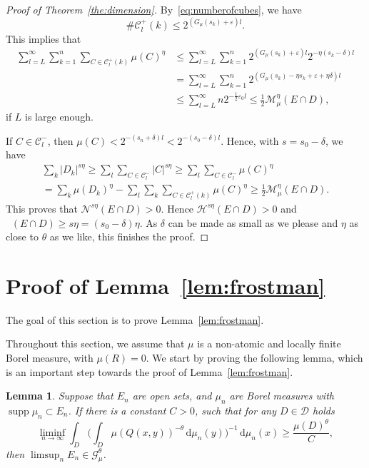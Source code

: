 \documentclass[11pt]{article}
\newtheorem{lemm}[theo]{Lemma}
\theoremstyle{definition}
\numberwithin{equation}{section}
\numberwithin{figure}{section}
\numberwithin{table}{section}
\DeclareMathOperator{\dimh}{dim_H}
\DeclareMathOperator{\supp}{supp}
\newcommand*{\dd}{\mathrm{d}}
\begin{document}
\begin{proof}[Proof of Theorem~\ref{the:dimension}]
By~\eqref{eq:numberofcubes}, we have
\[
\# \mathscr{C}_l^+ (k) \leq 2^{(G_{\mu} (s_k) + \varepsilon)l}.
\]
This implies that
\begin{align*}
\sum_{l=L}^\infty \sum_{k=1}^n \sum_{C \in \mathscr{C}_l^+ (k)}
\mu (C)^\eta &\leq \sum_{l=L}^\infty \sum_{k=1}^n 2^{(G_{\mu} (s_k) + \varepsilon)l} 2^{-\eta (s_k-\delta) l} \\ & =
\sum_{l=L}^\infty \sum_{k=1}^n 2^{(G_\mu (s_k) - \eta s_k +
\varepsilon + \eta \delta) l} \\ &\leq \sum_{l=L}^\infty n 2^{-\frac{1}{2} \varepsilon_0 l} \leq \frac{1}{2}
\mathscr{M}_\mu^\eta (E \cap D),
\end{align*}
if $L$ is large enough.

If $C \in \mathscr{C}_l^-$, then $\mu (C) < 2^{-(s_n+\delta)l} < 2^{-(s_0-\delta)l}$. Hence, with $s = s_0 - \delta$, we have
\begin{multline*}
\sum_k |D_k|^{s \eta} \geq \sum_l \sum_{C \in \mathscr{C}_l^-} |C|^{s \eta} \geq \sum_l \sum_{C \in \mathscr{C}_l^-} \mu (C)^\eta \\ = \sum_k \mu(D_k)^\eta - \sum_l \sum_k \sum_{C \in
\mathscr{C}_l^+ (k)} \mu (C)^\eta \geq \frac{1}{2}
\mathscr{M}_\mu^\eta (E \cap D).
\end{multline*}
This proves that $\mathscr{N}^{s \eta} (E \cap D) > 0$. Hence $\mathscr{H}^{s \eta} (E \cap D) > 0$ and $\dimh (E \cap D) \geq s
\eta = (s_0 - \delta) \eta$. As $\delta$ can be made as small as we please and $\eta$ as close to $\theta$ as we like, this finishes the proof.
\end{proof}


\section{Proof of Lemma~\ref{lem:frostman}} \label{sec:inhomogeneousproofs}

The goal of this section is to prove Lemma~\ref{lem:frostman}.

Throughout this section, we assume that $\mu$ is a non-atomic and locally finite Borel measure, with $\mu (R) = 0$. We start by proving the following lemma, which is an important step towards the proof of Lemma~\ref{lem:frostman}.

\begin{lemm}\label{lem:frostman2}
Suppose that $E_n$ are open sets, and $\mu_n$ are Borel measures with $\supp \mu_n \subset E_n$. If there is a constant $C > 0$, such that for any $D \in \mathscr{D}$ holds
\begin{equation}\label{eq:energycondition}
\liminf_{n \to \infty} \int_D \biggl(\int_D \mu (Q (x,y))^{-\theta} \, \dd \mu_n (y) \biggr)^{-1} \,
\dd \mu_n (x) \geq \frac{\mu (D)^\theta}{C},
\end{equation}
then $\limsup_n E_n \in \mathscr{G}_\mu^\theta$.
\end{lemm}
\end{document}
